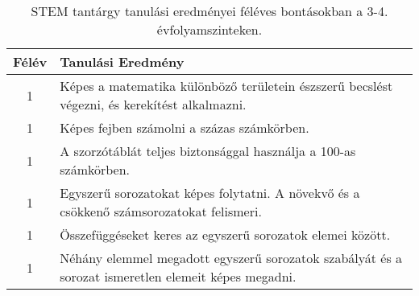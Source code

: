             \clearpage

       
           \begin{longtable}{c | p{12cm} }
            \caption[STEM 3-4.]{STEM tantárgy tanulási eredményei féléves bontásokban a 3-4. évfolyamszinteken. }  \\

            \textbf{Félév} & \textbf{Tanulási Eredmény} \\
            \hline
            \endhead
                                
                                      
                                
                                          1 &  Képes a matematika különböző területein észszerű becslést végezni, és kerekítést alkalmazni. \\ \hline
                                          1 &  Képes fejben számolni a százas számkörben. \\ \hline
                                          1 &  A szorzótáblát teljes biztonsággal használja a 100-as számkörben. \\ \hline
                                          1 &  Egyszerű sorozatokat képes folytatni. A növekvő és a csökkenő számsorozatokat felismeri. \\ \hline
                                          1 &  Összefüggéseket keres az egyszerű sorozatok elemei között. \\ \hline
                                          1 &  Néhány elemmel megadott egyszerű sorozatok szabályát és a sorozat ismeretlen elemeit képes megadni. \\ \hline
                                      

\end{longtable}
